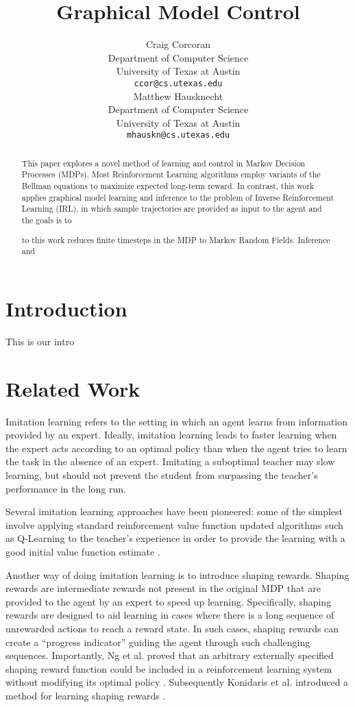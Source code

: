 \documentclass{article} %
\title{Graphical Model Control}
\author{
Craig Corcoran\\
Department of Computer Science\\
University of Texas at Austin\\
\texttt{ccor@cs.utexas.edu} \\
\And
Matthew Hausknecht\\
Department of Computer Science\\
University of Texas at Austin\\
\texttt{mhauskn@cs.utexas.edu} \\
}
\begin{document}
\maketitle

\begin{abstract}
  This paper explores a novel method of learning and control in Markov Decision Processes (MDPs). Most Reinforcement Learning algorithms employ variants of the Bellman equations to maximize expected long-term reward. In contrast, this work applies graphical model learning and inference to the problem of Inverse Reinforcement Learning (IRL), in which sample trajectories are provided as input to the agent and the goals is to 

to this work reduces finite timesteps in the MDP to Markov Random Fields. Inference and 
\end{abstract}

\section{Introduction}
This is our intro

\section{Related Work}
Imitation learning refers to the setting in which an agent learns from information provided by an expert. Ideally, imitation learning leads to faster learning when the expert acts according to an optimal policy than when the agent tries to learn the task in the absence of an expert. Imitating a suboptimal teacher may slow learning, but should not prevent the student from surpassing the teacher's performance in the long run.

Several imitation learning approaches have been pioneered: some of the simplest involve applying standard reinforcement value function updated algorithms such as Q-Learning to the teacher's experience in order to provide the learning with a good initial value function estimate \cite{whitehead91,price01}. 

Another way of doing imitation learning is to introduce shaping rewards. Shaping rewards are intermediate rewards not present in the original MDP that are provided to the agent by an expert to speed up learning. Specifically, shaping rewards are designed to aid learning in cases where there is a long sequence of unrewarded actions to reach a reward state. In such cases, shaping rewards can create a ``progress indicator'' guiding the agent through such challenging sequences. Importantly, Ng et al. proved that an arbitrary externally specified shaping reward function could be included in a reinforcement learning system without modifying its optimal policy \cite{ng99}. Subsequently Konidaris et al. introduced a method for learning shaping rewards \cite{konidaris06}.
\end{document}
